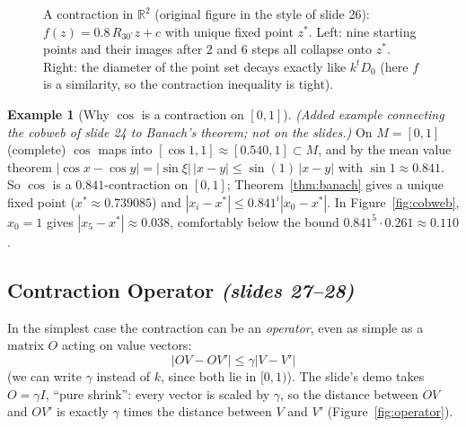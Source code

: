 \documentclass[11pt,a4paper]{article}
\newcommand{\R}{\mathbb{R}}
\newcommand{\abs}[1]{\left\lvert #1\right\rvert}
\newcommand{\slides}[1]{\texorpdfstring{\emph{(slides #1)}}{(slides #1)}}
\theoremstyle{plain}
\theoremstyle{definition}
\newtheorem{example}{Example}\renewcommand{\theexample}{E\arabic{example}}
\theoremstyle{remark}
\newcommand{\figref}[1]{Figure~\ref{#1}}
\begin{document}
\begin{figure}[htbp]
\begin{minipage}{0.45\linewidth}
\end{minipage}
\caption{A contraction in $\R^2$ (original figure in the style of slide 26): $f(z)=0.8\,R_{30^\circ}z+c$ with unique fixed point $z^*$. Left: nine starting points and their images after $2$ and $6$ steps all collapse onto $z^*$. Right: the diameter of the point set decays exactly like $k^tD_0$ (here $f$ is a similarity, so the contraction inequality is tight).}
\label{fig:contraction}
\end{figure}

\begin{example}[{Why $\cos$ is a contraction on $[0,1]$}]\label{ex:cos}
\emph{(Added example connecting the cobweb of slide 24 to Banach's theorem; not on the slides.)} On $M=[0,1]$ (complete) $\cos$ maps into $[\cos1,1]\approx[0.540,1]\subset M$, and by the mean value theorem $\abs{\cos x-\cos y}=\abs{\sin\xi}\,\abs{x-y}\le\sin(1)\,\abs{x-y}$ with $\sin 1\approx0.841$. So $\cos$ is a $0.841$-contraction on $[0,1]$; Theorem~\ref{thm:banach} gives a unique fixed point ($x^*\approx0.739085$) and $\abs{x_i-x^*}\le0.841^i\abs{x_0-x^*}$. In \figref{fig:cobweb}, $x_0=1$ gives $\abs{x_5-x^*}\approx0.038$, comfortably below the bound $0.841^5\cdot0.261\approx0.110$.
\end{example}

\subsection{Contraction Operator \slides{27--28}}
In the simplest case the contraction can be an \emph{operator}, even as simple as a matrix $O$ acting on value vectors:
\[
\abs{OV-OV'}\le\gamma\abs{V-V'}
\]
(we can write $\gamma$ instead of $k$, since both lie in $[0,1)$). The slide's demo takes $O=\gamma I$, ``pure shrink'': every vector is scaled by $\gamma$, so the distance between $OV$ and $OV'$ is exactly $\gamma$ times the distance between $V$ and $V'$ (\figref{fig:operator}).
\end{document}
